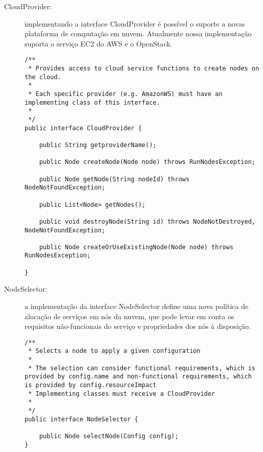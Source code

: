 \begin{description}

\item [CloudProvider:] implementando a interface \textsf{CloudProvider} é possível o suporte a novas plataforma de computação em nuvem. Atualmente nossa implementação suporta o serviço EC2 do AWS e o OpenStack.

\begin{lstlisting}[frame=trbl, label=lst:cloud_provider, caption=Interface CloudProvider]
/**
 * Provides access to cloud service functions to create nodes on the cloud. 
 * 
 * Each specific provider (e.g. AmazonWS) must have an implementing class of this interface.
 * 
 */
public interface CloudProvider {

	public String getproviderName();
	
	public Node createNode(Node node) throws RunNodesException;

	public Node getNode(String nodeId) throws NodeNotFoundException;

	public List<Node> getNodes();

	public void destroyNode(String id) throws NodeNotDestroyed, NodeNotFoundException;

	public Node createOrUseExistingNode(Node node) throws RunNodesException;

}
\end{lstlisting}


\item [NodeSelector:] a implementação da interface \textsf{NodeSelector} define uma nova política de alocação de serviços em nós da nuvem, que pode levar em conta os requisitos não-funcionais do serviço e propriedades dos nós à disposição.

\begin{lstlisting}[frame=trbl, label=lst:node_selector, caption=Interface NodeSelector]
/**
 * Selects a node to apply a given configuration
 * 
 * The selection can consider functional requirements, which is provided by config.name and non-functional requirements, which is provided by config.resourceImpact
 * Implementing classes must receive a CloudProvider
 * 
 */
public interface NodeSelector {

	public Node selectNode(Config config);
}
\end{lstlisting}


\end{description}
